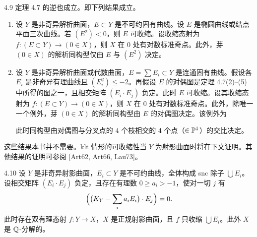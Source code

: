 \begin{remark}{4.9}
定理 4.7 的逆也成立。即下列结果成立。
\begin{enumerate}[label=(\arabic*),leftmargin=*]
\item 设 $Y$ 是非奇异解析曲面，$E\subset Y$ 是不可约固有曲线。设 $E$ 是椭圆曲线或结点平面三次曲线。若 $(E^2)<0$，则 $E$ 可收缩。设收缩态射为 $f\colon(E\subset Y)\to(0\in X)$，则 $X$ 在 $0$ 处有对数标准奇点。此外，芽 $(0\in X)$ 的解析同构型仅由 $E$ 与 $(E^2)$ 决定。
\item 设 $Y$ 是非奇异解析曲面或代数曲面，$E=\sum E_i\subset Y$ 是连通固有曲线。假设各 $E_i$ 是非奇异有理曲线且 $(E_i^2)\le -2$。再假设 $E$ 的对偶图是定理 4.7(2)–(5) 中所得的图之一，且相交矩阵 $(E_i\cdot E_j)$ 负定。此时 $E$ 可收缩。设其收缩态射为 $f\colon(E\subset Y)\to(0\in X)$，则 $X$ 在 $0$ 处有对数标准奇点。此外，除唯一一个例外，芽 $(0\in X)$ 的解析同构型由 $E$ 的对偶图决定。该例外为
\begin{center}
\end{center}
此时同构型由对偶图与分叉点的 $4$ 个枝相交的 $4$ 个点（$\in\mathbb{P}^1$）的交比决定。
\end{enumerate}
这些结果本书并不需要。klt 情形的可收缩性当 $Y$ 为射影曲面时将在下文证明。其他结果的证明可参阅 [Art62, Art66, Lau73]。
\end{remark}

\begin{propositionp}{4.10}
设 $Y$ 是非奇异射影曲面，$E_i\subset Y$ 是不可约曲线，全体构成 snc 除子 $\bigcup E_i$。设相交矩阵 $(E_i\cdot E_j)$ 负定，且存在有理数 $0\ge a_i>-1$，使对一切 $j$ 有
\[
\Bigl(\bigl(K_Y-\sum_i a_iE_i\bigr)\cdot E_j\Bigr)=0 .
\]
此时存在双有理态射 $f\colon Y\to X$，$X$ 是正规射影曲面，且 $f$ 只收缩 $\bigcup E_i$。此外 $X$ 是 $\mathbb{Q}$-分解的。
\end{propositionp}

